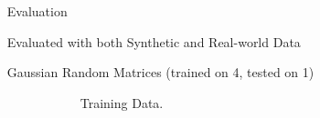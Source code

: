 \documentclass[final]{beamer}
\begin{document}
{\begin{frame}{}
\begin{center}
\begin{columns}[t]
\begin{column}{0.32\textwidth}
\end{column}

\begin{column}{0.32\textwidth}

       \begin{block}{\huge Evaluation}

\vspace{1cm}
{\Large Evaluated with both Synthetic and Real-world Data}
\begin{itemize}{\Large
\item Gaussian Random Matrices (trained on 4, tested on 1)
\begin{figure}
	\begin{subfigure}[b]{.45\textwidth}
\begin{center}
		\caption{Training Data.}
\end{center}
	\end{subfigure}
\hspace{1cm}
	\begin{subfigure}[b]{.45\textwidth}
\begin{center}

\end{center}
\end{subfigure}
\end{figure}}
\end{itemize}
\end{block}
\end{column}
\end{columns}
\end{center}
\end{frame}}
\end{document}
